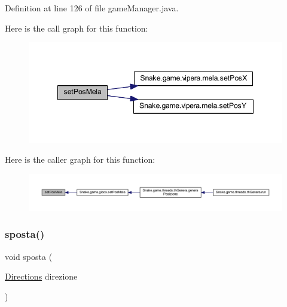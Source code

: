 Definition at line 126 of file game\+Manager.\+java.

Here is the call graph for this function\+:
\nopagebreak
\begin{figure}[H]
\begin{center}
\leavevmode
\includegraphics[width=348pt]{class_snake_1_1game_1_1utility_1_1game_manager_a38aa4a80eb7f9db1e033f67dc1c220b0_cgraph}
\end{center}
\end{figure}
Here is the caller graph for this function\+:
\nopagebreak
\begin{figure}[H]
\begin{center}
\leavevmode
\includegraphics[width=350pt]{class_snake_1_1game_1_1utility_1_1game_manager_a38aa4a80eb7f9db1e033f67dc1c220b0_icgraph}
\end{center}
\end{figure}
\mbox{\label{class_snake_1_1game_1_1utility_1_1game_manager_a9837912437f9fefee6140800ce8d6d76}} 
\subsubsection{\texorpdfstring{sposta()}{sposta()}}
{\footnotesize\ttfamily void sposta (\begin{DoxyParamCaption}\item[{\mbox{\hyperlink{enum_snake_1_1game_1_1utility_1_1_directions}{Directions}}}]{direzione }\end{DoxyParamCaption})}



